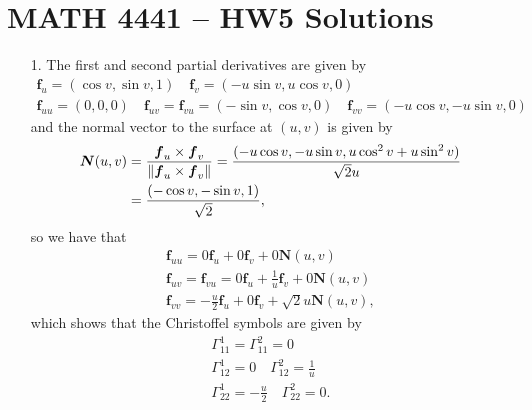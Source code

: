 \documentclass[a4paper,12pt]{article}
\newcommand{\bs}{\boldsymbol}
\theoremstyle{remark}
\begin{document}
\section*{MATH 4441 -- HW5 Solutions}
\begin{enumerate}
    \item[1.]
        The first and second partial derivatives are given by
        \begin{gather*}
            \bs{f}_u = (\cos v, \sin v, 1) \quad
            \bs{f}_v = (-u\sin v, u\cos v, 0) \\
            \bs{f}_{uu} = (0, 0, 0) \quad
            \bs{f}_{uv} = \bs{f}_{vu} = (-\sin v, \cos v, 0) \quad 
            \bs{f}_{vv} = (-u\cos v, -u\sin v, 0)
        \end{gather*}
        and the normal vector to the surface at $(u, v)$ is given by
        \begin{align*}
            \bs{N}(u, v) &= \frac{\bs{f}_u \times \bs{f}_v}{\norm{\bs{f}_u \times \bs{f}_v}} = \frac{(-u\cos v, -u\sin v, u\cos^2v + u\sin^2v)}{\sqrt{2}u} \\
            &= \frac{(-\cos v, -\sin v, 1)}{\sqrt{2}},
        \end{align*}
        so we have that
        \begin{gather*}
            \bs{f}_{uu} = 0\bs{f}_u + 0\bs{f}_v + 0\bs{N}(u, v) \\
            \bs{f}_{uv} = \bs{f}_{vu} = 0\bs{f}_u + \frac{1}{u}\bs{f}_v + 0\bs{N}(u, v) \\
            \bs{f}_{vv} = -\frac{u}{2}\bs{f}_u + 0\bs{f}_v + \sqrt{2}u\bs{N}(u, v),
        \end{gather*}
        which shows that the Christoffel symbols are given by
        \begin{gather*}
            \Gamma_{11}^1 =
            \Gamma_{11}^2 = 0 \\
            \Gamma_{12}^1 = 0 \quad
            \Gamma_{12}^2 = \frac{1}{u} \\
            \Gamma_{22}^1 = -\frac{u}{2} \quad
            \Gamma_{22}^2 = 0.
        \end{gather*}


\end{enumerate}
\end{document}
